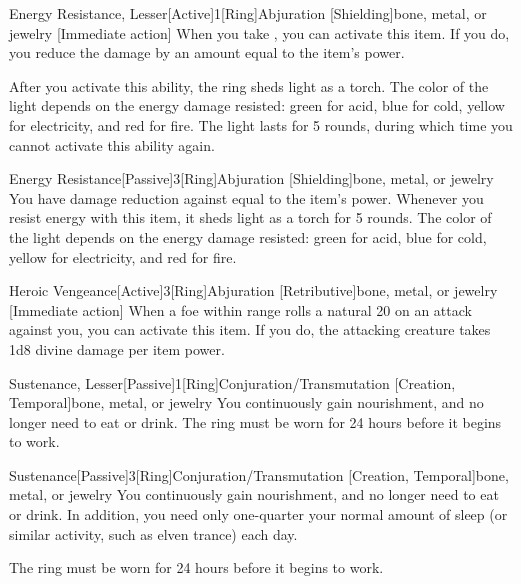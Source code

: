 \begin{magicitemdef}{Energy Resistance, Lesser}[Active]{1}[Ring]{Abjuration [Shielding]}{bone, metal, or jewelry}
    [Immediate action] When you take , you can activate this item. If you do, you reduce the damage by an amount equal to the item's power.

    After you activate this ability, the ring sheds light as a torch.
    The color of the light depends on the energy damage resisted: green for acid, blue for cold, yellow for electricity, and red for fire.
    The light lasts for 5 rounds, during which time you cannot activate this ability again.
\end{magicitemdef}

\begin{magicitemdef}{Energy Resistance}[Passive]{3}[Ring]{Abjuration [Shielding]}{bone, metal, or jewelry}
     You have damage reduction against  equal to the item's power.
    Whenever you resist energy with this item, it sheds light as a torch for 5 rounds.
    The color of the light depends on the energy damage resisted: green for acid, blue for cold, yellow for electricity, and red for fire.
\end{magicitemdef}

\begin{magicitemdef}{Heroic Vengeance}[Active]{3}[Ring]{Abjuration [Retributive]}{bone, metal, or jewelry}
    [Immediate action] When a foe within \rngmed range rolls a natural 20 on an attack against you, you can activate this item. If you do, the attacking creature takes 1d8 divine damage per item power.
\end{magicitemdef}

\begin{magicitemdef}{Sustenance, Lesser}[Passive]{1}[Ring]{Conjuration/Transmutation [Creation, Temporal]}{bone, metal, or jewelry}
     You continuously gain nourishment, and no longer need to eat or drink.
    The ring must be worn for 24 hours before it begins to work.
\end{magicitemdef}

\begin{magicitemdef}{Sustenance}[Passive]{3}[Ring]{Conjuration/Transmutation [Creation, Temporal]}{bone, metal, or jewelry}
     You continuously gain nourishment, and no longer need to eat or drink.
    In addition, you need only one-quarter your normal amount of sleep (or similar activity, such as elven trance) each day.

    The ring must be worn for 24 hours before it begins to work.
\end{magicitemdef}


